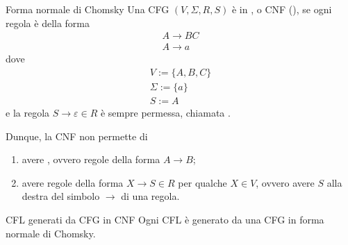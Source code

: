 \documentclass[a4paper, 12pt]{report}
\begin{document}
    \begin{frameddefn}{Forma normale di Chomsky}
        Una CFG $(V, \Sigma, R, S)$ è in , o CNF (), se ogni regola è della forma $$\left . \begin{array}{c} A \to BC \\ A \to a \end{array} \right .$$ dove $$\left . \begin{array}{c} V := \{ A, B, C \} \\ \Sigma := \{ a\} \\ S := A \end{array} \right .$$ e la regola $S \to \varepsilon \in R$ è sempre permessa, chiamata .

        Dunque, la CNF non permette di

        \begin{enumerate}[label=\roman*), font=\itshape]
            \item avere , ovvero regole della forma $A \to B$;
            \item avere regole della forma $X \to S \in R$ per qualche $X \in V$, ovvero avere $S$ alla destra del simbolo $\to$ di una regola.
        \end{enumerate}
    \end{frameddefn}

    \begin{framedthm}{CFL generati da CFG in CNF}
        Ogni CFL è generato da una CFG in forma normale di Chomsky.
    \end{framedthm}
\end{document}
